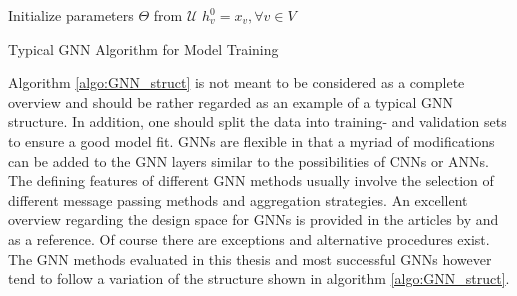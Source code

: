 	\begin{algorithm}[h]
		\scriptsize
		\SetAlgoLined
		\nl Initialize parameters $\Theta$ from $\mathcal{U}$\;
		\nl $h_{v}^{0} = x_{v},\forall v \in V$\\
		\nl {}
		\caption{Typical GNN Algorithm for Model Training}
		\label{algo:GNN_struct}
	\end{algorithm}

	\noindent Algorithm \ref{algo:GNN_struct} is not meant to be considered as
	a complete overview and should be rather regarded as an example of a typical 
	GNN structure. In addition, one should split the data into training-
	and validation sets to ensure a good model fit. GNNs are flexible in that a 
	myriad of modifications can be added to the GNN layers similar to the 
	possibilities of CNNs or ANNs. The defining features of different GNN 
	methods usually involve the selection of different message passing methods 
	and aggregation strategies. An excellent overview regarding the design space 
	for GNNs is provided in the articles by \cite{you2020design} and 
	\cite{zhou2020graph} as a reference. Of course there are exceptions and 
	alternative procedures exist. The GNN methods evaluated in this thesis and 
	most successful GNNs however tend to follow a variation of the structure 
	shown in algorithm \ref{algo:GNN_struct}.  \\

